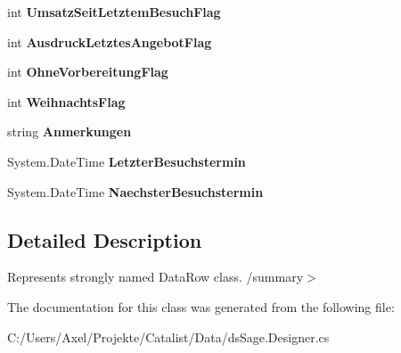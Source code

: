 \begin{DoxyCompactItemize}
\item 
int {\bfseries Umsatz\+Seit\+Letztem\+Besuch\+Flag}\hypertarget{class_products_1_1_data_1_1ds_sage_1_1_kunde_row_a8ffaf9ef4675327859aac8325537797b}{}\label{class_products_1_1_data_1_1ds_sage_1_1_kunde_row_a8ffaf9ef4675327859aac8325537797b}

\item 
int {\bfseries Ausdruck\+Letztes\+Angebot\+Flag}\hypertarget{class_products_1_1_data_1_1ds_sage_1_1_kunde_row_a3ccc9abba196260fcd7b84fd10af5498}{}\label{class_products_1_1_data_1_1ds_sage_1_1_kunde_row_a3ccc9abba196260fcd7b84fd10af5498}

\item 
int {\bfseries Ohne\+Vorbereitung\+Flag}\hypertarget{class_products_1_1_data_1_1ds_sage_1_1_kunde_row_a780c0f0d827e602b09e5b5a9d6a3e2e5}{}\label{class_products_1_1_data_1_1ds_sage_1_1_kunde_row_a780c0f0d827e602b09e5b5a9d6a3e2e5}

\item 
int {\bfseries Weihnachts\+Flag}\hypertarget{class_products_1_1_data_1_1ds_sage_1_1_kunde_row_a962e936c28da1774bcddc3583e4f0228}{}\label{class_products_1_1_data_1_1ds_sage_1_1_kunde_row_a962e936c28da1774bcddc3583e4f0228}

\item 
string {\bfseries Anmerkungen}\hypertarget{class_products_1_1_data_1_1ds_sage_1_1_kunde_row_a416a3731e529aa403b4103d6410464fc}{}\label{class_products_1_1_data_1_1ds_sage_1_1_kunde_row_a416a3731e529aa403b4103d6410464fc}

\item 
System.\+Date\+Time {\bfseries Letzter\+Besuchstermin}\hypertarget{class_products_1_1_data_1_1ds_sage_1_1_kunde_row_ae02322678d5ec8c7cba86787380afae1}{}\label{class_products_1_1_data_1_1ds_sage_1_1_kunde_row_ae02322678d5ec8c7cba86787380afae1}

\item 
System.\+Date\+Time {\bfseries Naechster\+Besuchstermin}\hypertarget{class_products_1_1_data_1_1ds_sage_1_1_kunde_row_ac4442f607c02fca97eac5daf812fa008}{}\label{class_products_1_1_data_1_1ds_sage_1_1_kunde_row_ac4442f607c02fca97eac5daf812fa008}

\end{DoxyCompactItemize}


\subsection{Detailed Description}
Represents strongly named Data\+Row class. /summary$>$ 

The documentation for this class was generated from the following file\+:\begin{DoxyCompactItemize}
\item 
C\+:/\+Users/\+Axel/\+Projekte/\+Catalist/\+Data/ds\+Sage.\+Designer.\+cs\end{DoxyCompactItemize}
